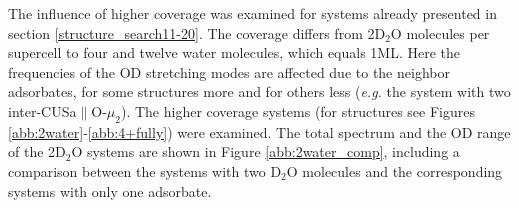 \documentclass[11pt,DIV=13,BCOR=5mm,a4paper,headinclude]{scrbook}
\begin{document}
The influence of higher coverage was examined for systems already presented in section \ref{structure_search11-20}.
The coverage differs from 2D$_2$O molecules per supercell to four and twelve water molecules, which equals 1ML.
Here the frequencies of the OD stretching modes are affected due to the neighbor adsorbates, for some structures more and for others less (\textit{e.g.} the system with two inter-CUSa$\parallel$O-$\mu_2$).
The higher coverage systems (for structures see Figures \ref{abb:2water}-\ref{abb:4+fully}) were examined.
The total spectrum and the OD range of the 2D$_2$O systems are shown in Figure %
\ref{abb:2water_comp}, including a comparison between the systems with two D$_2$O molecules and the corresponding systems with only one adsorbate.
\end{document}

